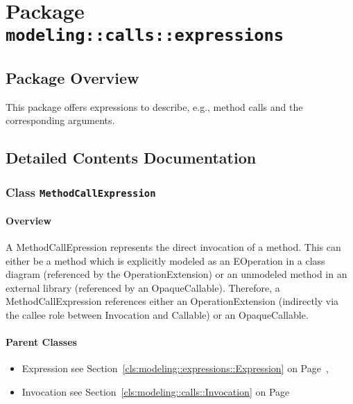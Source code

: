 \section{Package \bfseries \texttt{modeling::calls::expressions}\normalfont}
\subsection{Package Overview}
	
			
This package offers expressions to describe, e.g., method calls and the corresponding arguments.	
		
	
			
		



\subsection{Detailed Contents Documentation}
\subsubsection{\Large{Class \bfseries \texttt{MethodCallExpression}\normalfont}}
\label{cls:modeling::calls::expressions::MethodCallExpression} 
\paragraph{Overview}

	
			
A MethodCallEpression represents the direct invocation of a method. This can either be a method which is explicitly modeled as an EOperation in a class diagram (referenced by the OperationExtension) or an unmodeled method in an external library (referenced by an OpaqueCallable). Therefore, a MethodCallExpression references either an OperationExtension (indirectly via the callee role between Invocation and Callable) or an OpaqueCallable.	
		
	



\paragraph{Parent Classes}
\begin{itemize}
\item Expression see Section~\ref{cls:modeling::expressions::Expression} on Page~\pageref{cls:modeling::expressions::Expression}, \item Invocation see Section~\ref{cls:modeling::calls::Invocation} on Page~\pageref{cls:modeling::calls::Invocation}\end{itemize}
